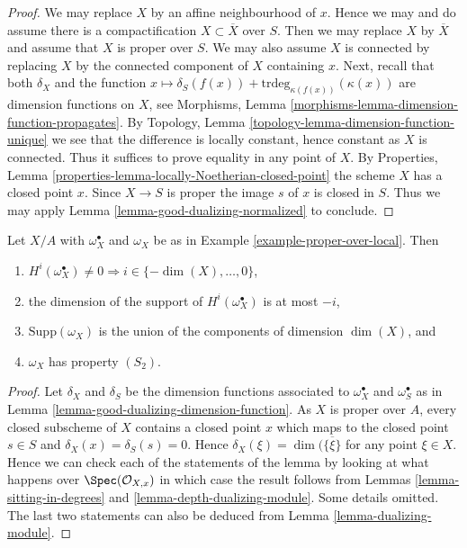 \begin{proof}
We may replace $X$ by an affine neighbourhood of $x$. Hence we may
and do assume there is a compactification $X \subset \overline{X}$
over $S$. Then we may replace $X$ by $\overline{X}$ and assume
that $X$ is proper over $S$. We may also assume $X$ is connected
by replacing $X$ by the connected component of $X$ containing $x$.
Next, recall that both $\delta_X$ and the function
$x \mapsto \delta_S(f(x)) + \text{trdeg}_{\kappa(f(x))}(\kappa(x))$
are dimension functions on $X$, see
Morphisms, Lemma \ref{morphisms-lemma-dimension-function-propagates}.
By Topology, Lemma \ref{topology-lemma-dimension-function-unique}
we see that the difference is locally constant, hence constant as $X$ is
connected. Thus it suffices to prove equality in any point of $X$.
By Properties, Lemma \ref{properties-lemma-locally-Noetherian-closed-point}
the scheme $X$ has a closed point $x$. Since $X \to S$ is proper
the image $s$ of $x$ is closed in $S$. Thus we may apply
Lemma \ref{lemma-good-dualizing-normalized} to conclude.
\end{proof}

\begin{lemma}
\label{lemma-vanishing-good-dualizing}
Let $X/A$ with $\omega_X^\bullet$ and $\omega_X$ be as in
Example \ref{example-proper-over-local}. Then
\begin{enumerate}
\item $H^i(\omega_X^\bullet) \not = 0 \Rightarrow
i \in \{-\dim(X), \ldots, 0\}$,
\item the dimension of the support of $H^i(\omega_X^\bullet)$ is at most $-i$,
\item $\text{Supp}(\omega_X)$ is the union of
the components of dimension $\dim(X)$, and
\item $\omega_X$ has property $(S_2)$.
\end{enumerate}
\end{lemma}

\begin{proof}
Let $\delta_X$ and $\delta_S$ be the dimension functions associated to
$\omega_X^\bullet$ and $\omega_S^\bullet$ as in
Lemma \ref{lemma-good-dualizing-dimension-function}.
As $X$ is proper over $A$, every closed subscheme of $X$ contains
a closed point $x$ which maps to the closed point $s \in S$
and $\delta_X(x) = \delta_S(s) = 0$. Hence
$\delta_X(\xi) = \dim(\overline{\{\xi\}}$ for any point
$\xi \in X$. Hence we can check each of
the statements of the lemma by looking at what happens over
$\Spec(\mathcal{O}_{X, x})$ in which case the result follows
from Lemmas \ref{lemma-sitting-in-degrees} and
\ref{lemma-depth-dualizing-module}.
Some details omitted.
The last two statements can also be deduced from
Lemma \ref{lemma-dualizing-module}.
\end{proof}

